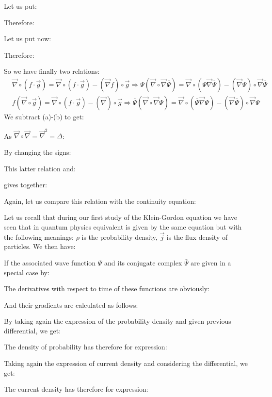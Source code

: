 	Let us put:
	
	Therefore:
	
	Let us put now:
	
	Therefore:
	
	So we have finally two relations:
	\begin{subequations}
	\label{equations}
	\begin{align}
	  \label{eq:a}
	  &\vec{\nabla}\circ(f\cdot \vec{g})=\vec{\nabla}\circ(f\cdot \vec{g})-(\vec{\nabla} f)\circ \vec{g}\Rightarrow \Psi(\vec{\nabla}\circ\vec{\nabla}\bar{\Psi})=\vec{\nabla}\circ(\Psi\vec{\nabla}\bar{\Psi})-(\vec{\nabla}\Psi)\circ\vec{\nabla}\bar{\Psi}\\
	  \label{eq:b}
	  &f(\vec{\nabla}\circ\vec{g})=\vec{\nabla}\circ(f\cdot \vec{g})-(\vec{\nabla})\circ\vec{g}\Rightarrow \bar{\Psi}(\vec{\nabla}\circ\vec{\nabla}\Psi)=\vec{\nabla}\circ(\bar{\Psi}\vec{\nabla}\Psi)-(\vec{\nabla}\bar{\Psi})\circ\vec{\nabla}\Psi
	\end{align}
	\end{subequations}
	We subtract (a)-(b) to get:
	
	As $\vec{\nabla}\circ\vec{\nabla}=\vec{\nabla}^2=\Delta$:
	
	By changing the signs:
	
	This latter relation and:
	
	gives together:
	
	Again, let us compare this relation with the continuity equation:
	
	Let us recall that during our first study of the Klein-Gordon equation we have seen that in quantum physics equivalent is given by the same equation but with the following meanings: $\rho$ is the probability density, $\vec{j}$ is the flux density of particles.
	We then have:
	
	If the associated wave function $\Psi$ and its conjugate complex $\bar{\Psi}$ are given in a special case by:
	
	The derivatives with respect to time of these functions are obviously:
	
	And their gradients are calculated as follows:
	
	By taking again the expression of the probability density and given previous differential, we get:
	
	The density of probability has therefore for expression:
	
	Taking again the expression of current density and considering the differential, we get:
	
	The current density has therefore for expression:
	
